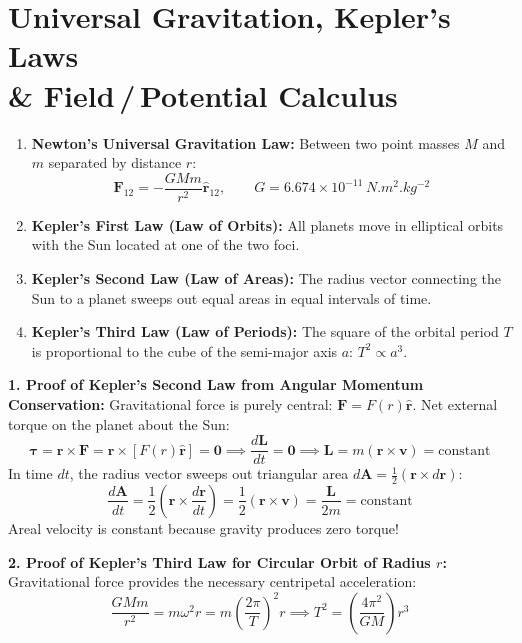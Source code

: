 \documentclass[10pt,twoside,openright]{book}
\begin{document}
\section[Universal Gravitation \& Kepler's Laws]{Universal Gravitation, Kepler's Laws \\ \& Field\,/\,Potential Calculus}

\begin{conceptbox}
\begin{enumerate}[leftmargin=*]
  \item \textbf{Newton's Universal Gravitation Law:} Between two point masses $M$ and $m$ separated by distance $r$:
  \begin{equation}
    \mathbf{F}_{12} = -\frac{G M m}{r^2}\hat{\mathbf{r}}_{12}, \qquad G = 6.674\times 10^{-11}\,\si{N.m^2.kg^{-2}}
  \end{equation}
  \item \textbf{Kepler's First Law (Law of Orbits):} All planets move in elliptical orbits with the Sun located at one of the two foci.
  \item \textbf{Kepler's Second Law (Law of Areas):} The radius vector connecting the Sun to a planet sweeps out equal areas in equal intervals of time.
  \item \textbf{Kepler's Third Law (Law of Periods):} The square of the orbital period $T$ is proportional to the cube of the semi-major axis $a$: $T^2 \propto a^3$.
\end{enumerate}
\end{conceptbox}

\begin{formulabox}
\textbf{1. Proof of Kepler's Second Law from Angular Momentum Conservation:}
Gravitational force is purely central: $\mathbf{F} = F(r)\hat{\mathbf{r}}$.
Net external torque on the planet about the Sun:
\begin{equation}
  \boldsymbol{\tau} = \mathbf{r} \times \mathbf{F} = \mathbf{r} \times [F(r)\hat{\mathbf{r}}] = \mathbf{0} \implies \frac{d\mathbf{L}}{dt} = \mathbf{0} \implies \mathbf{L} = m(\mathbf{r}\times\mathbf{v}) = \text{constant}
\end{equation}
In time $dt$, the radius vector sweeps out triangular area $d\mathbf{A} = \frac{1}{2}(\mathbf{r}\times d\mathbf{r})$:
\begin{equation}
  \frac{d\mathbf{A}}{dt} = \frac{1}{2}\left(\mathbf{r}\times\frac{d\mathbf{r}}{dt}\right) = \frac{1}{2}(\mathbf{r}\times\mathbf{v}) = \frac{\mathbf{L}}{2m} = \text{constant}
\end{equation}
Areal velocity is constant because gravity produces zero torque!

\textbf{2. Proof of Kepler's Third Law for Circular Orbit of Radius $r$:}
Gravitational force provides the necessary centripetal acceleration:
\begin{equation}
  \frac{G M m}{r^2} = m\omega^2 r = m\left(\frac{2\pi}{T}\right)^2 r \implies T^2 = \left(\frac{4\pi^2}{G M}\right)r^3
\end{equation}
\end{formulabox}
\end{document}
